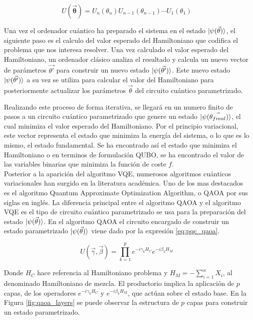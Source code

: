 \begin{equation}
    U(\boldsymbol{\Vec{\theta}}) = U_n(\theta_n) U_{n-1}(\theta_{n-1}) \cdots U_1(\theta_1)
    \label{eq:pqc_descompuesto}
\end{equation}

Una vez el ordenador cuántico ha preparado el sistema en el estado $\ket{\psi(\Vec{\theta})}$, el siguiente paso es el calculo del valor esperado del Hamiltoniano que codifica el problema que nos interesa resolver. Una vez calculado el valor esperado del Hamiltoniano, un ordenador clásico analiza el resultado y calcula un nuevo vector de parámetros $\Vec{\theta'}$ para construir un nuevo estado $\ket{\psi(\Vec{\theta'})}$. Este nuevo estado $\ket{\psi(\Vec{\theta'})}$ a su vez se utiliza para calcular el valor del Hamiltoniano para posteriormente actualizar los parámetros $\Vec{\theta}$ del circuito cuántico parametrizado.

\newpage

Realizando este proceso de forma iterativa, se llegará en un numero finito de pasos a un circuito cuántico parametrizado que genere un estado $\ket{\psi(\Vec{\theta_{final}})}$, el cual minimiza el valor esperado del Hamiltoniano. Por el principio variacional, este vector representa el estado que minimiza la energía del sistema, o lo que es lo mismo, el estado fundamental. Se ha encontrado así el estado que minimiza el Hamiltoniano o en terminos de formulación \mbox{QUBO}, se ha encontrado el valor de las variables binarias que minimiza la función de coste $f$. \\

Posterior a la aparición del algoritmo VQE, numerosos algoritmos cuánticos variacionales han surgido en la literatura académica. Uno de los mas destacados es el algoritmo Quantum Approximate Optimization Algorithm, o QAOA \citep{farhi} por sus siglas en inglés. La diferencia principal entre el algoritmo QAOA y el algoritmo VQE es el tipo de circuito cuántico parametrizado se usa para la preparación del estado  $\ket{\psi(\Vec{\theta})}$. En el algoritmo QAOA el circuito encargado de construir un estado parametrizado $\ket{\psi(\Vec{\theta})}$ viene dado por la expresión \ref{eq:pqc_qaoa}.


\begin{equation}
    U(\vec \gamma,\vec \beta)=\prod_{k=1}^p e^{-i \gamma_k H_C} e^{- i \beta_k H_M}
    \label{eq:pqc_qaoa}
\end{equation}

Donde $H_C$ hace referencia al Hamiltoniano problema y $H_M=-\sum_{i=1}^n X_i$, al denominado Hamiltoniano de mezcla. El productorio implica la aplicación de $p$ capas, de los operadores $e^{-i \gamma_k H_C}$ y $e^{- i \beta_k H_M}$, que actúan sobre el estado base. En la Figura \ref{fig:qaoa_layers} se puede observar la estructura de $p$ capas para construir un estado parametrizado.

